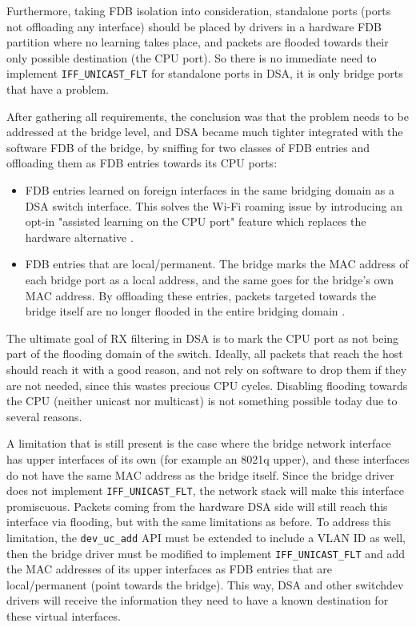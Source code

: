 \documentclass[letterpaper]{article}
\begin{document}
Furthermore, taking FDB isolation into consideration, standalone ports (ports
not offloading any interface) should be placed by drivers in a hardware FDB
partition where no learning takes place, and packets are flooded towards their
only possible destination (the CPU port). So there is no immediate need to
implement \verb|IFF_UNICAST_FLT| for standalone ports in DSA, it is only bridge
ports that have a problem.

After gathering all requirements, the conclusion was that the problem needs to
be addressed at the bridge level, and DSA became much tighter integrated with
the software FDB of the bridge, by sniffing for two classes of FDB entries and
offloading them as FDB entries towards its CPU ports:

\begin{itemize}
\item FDB entries learned on foreign interfaces in the same bridging domain as
      a DSA switch interface. This solves the Wi-Fi roaming issue by
      introducing an opt-in "assisted learning on the CPU port" feature which
      replaces the hardware alternative \cite{dsa-assisted-learning}.
\item FDB entries that are local/permanent. The bridge marks the MAC address of
      each bridge port as a local address, and the same goes for the bridge's
      own MAC address. By offloading these entries, packets targeted towards
      the bridge itself are no longer flooded in the entire bridging domain
      \cite{dsa-rx-filtering}.
\end{itemize}

The ultimate goal of RX filtering in DSA is to mark the CPU port as not being
part of the flooding domain of the switch. Ideally, all packets that reach the
host should reach it with a good reason, and not rely on software to drop them
if they are not needed, since this wastes precious CPU cycles. Disabling
flooding towards the CPU (neither unicast nor multicast) is not something
possible today due to several reasons.

A limitation that is still present is the case where the bridge network
interface has upper interfaces of its own (for example an 8021q upper), and
these interfaces do not have the same MAC address as the bridge itself. Since
the bridge driver does not implement \verb|IFF_UNICAST_FLT|, the network stack
will make this interface promiscuous. Packets coming from the hardware DSA side
will still reach this interface via flooding, but with the same limitations as
before. To address this limitation, the \verb|dev_uc_add| API must be extended
to include a VLAN ID as well, then the bridge driver must be modified to
implement \verb|IFF_UNICAST_FLT| and add the MAC addresses of its upper
interfaces as FDB entries that are local/permanent (point towards the bridge).
This way, DSA and other switchdev drivers will receive the information they
need to have a known destination for these virtual interfaces.
\end{document}
